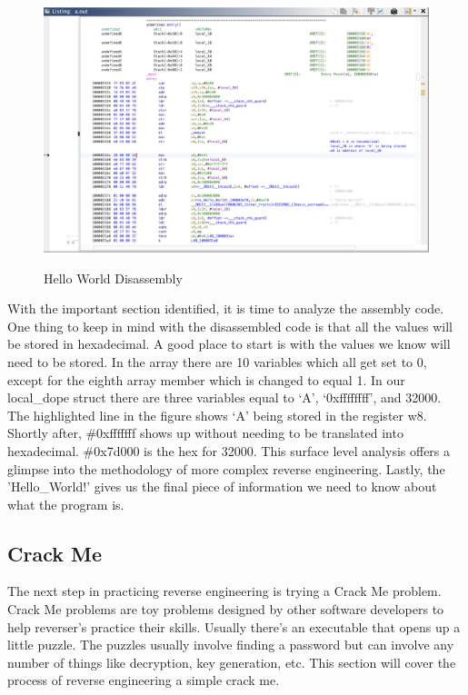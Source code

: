 \begin{figure}[h]
	\caption{Hello World Disassembly}
	\includegraphics[scale=.3]{HelloWorldGhidra.png}
        \label{fig:hellowworldghidra}
\end{figure}
With the important section identified, it is time to analyze the assembly code.
One thing to keep in mind with the disassembled code is that all the values will be stored in hexadecimal. 
A good place to start is with the values we know will need to be stored. 
In the array there are 10 variables which all get set to 0, except for the eighth array member which is changed to equal 1. 
In our local\_dope struct there are three variables equal to ‘A’, ‘0xffffffff’, and 32000. 
The highlighted line in the figure shows ‘A’ being stored in the register w8. Shortly after, \#0xfffffff shows up without needing to be translated into hexadecimal. 
\#0x7d000 is the hex for 32000. 
This surface level analysis offers a glimpse into the methodology of more complex reverse engineering. 
Lastly, the 'Hello\_World!' gives us the final piece of information we need to know about what the program is.

\subsection{Crack Me}
The next step in practicing reverse engineering is trying a Crack Me problem. 
Crack Me problems are toy problems designed by other software developers to help reverser's practice their skills. 
Usually there’s an executable that opens up a little puzzle. 
The puzzles usually involve finding a password but can involve any number of things like decryption, key generation, etc. 
This section will cover the process of reverse engineering a simple crack me.

